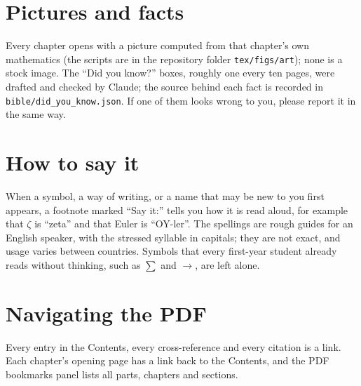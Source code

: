 \section*{Pictures and facts}
Every chapter opens with a picture computed from that chapter's own mathematics (the scripts are in the repository folder \texttt{tex/figs/art}); none is a stock image. The ``Did you know?'' boxes, roughly one every ten pages, were drafted and checked by Claude; the source behind each fact is recorded in \texttt{bible/did\_you\_know.json}. If one of them looks wrong to you, please report it in the same way.

\section*{How to say it}
When a symbol, a way of writing, or a name that may be new to you first appears, a footnote marked ``Say it:'' tells you how it is read aloud, for example that $\zeta$ is ``zeta'' and that Euler is ``OY-ler''. The spellings are rough guides for an English speaker, with the stressed syllable in capitals; they are not exact, and usage varies between countries. Symbols that every first-year student already reads without thinking, such as $\sum$ and $\to$, are left alone.

\section*{Navigating the PDF}
Every entry in the Contents, every cross-reference and every citation is a link. Each chapter's opening page has a link back to the Contents, and the PDF bookmarks panel lists all parts, chapters and sections.
